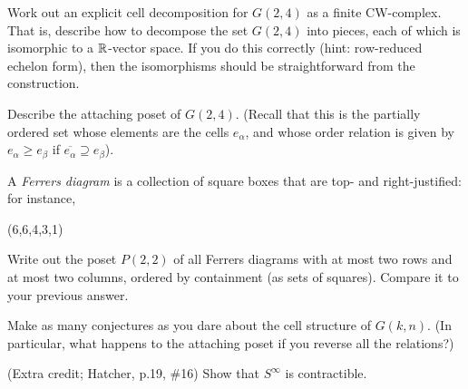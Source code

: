 \probpart Work out an explicit cell decomposition for $G(2,4)$
as a finite CW-complex.  That is,
describe how to decompose the set $G(2,4)$ into pieces, each of which is
isomorphic to a $\mathbb{R}$-vector space.
If you do this correctly (hint: row-reduced echelon form),
then the isomorphisms should be straightforward from the construction.

\probpart Describe the attaching poset of $G(2,4)$.  (Recall that this
is the partially ordered
set whose elements are the cells $e_\alpha$, and whose order
relation is given by $e_\alpha\geq e_\beta$ if
$\overline{e_\alpha}\supseteq e_\beta$).

\probpart A \emph{Ferrers diagram} is a collection of square boxes that
are top- and right-justified: for instance,
\begin{center}
\yng(6,6,4,3,1)
\end{center}
Write out the poset $P(2,2)$ of all Ferrers diagrams with at most two 
rows and at most two columns, ordered by containment (as sets of 
squares).  Compare it to your previous answer.

\probpart Make as many conjectures as you dare about the cell structure of
$G(k,n)$.  (In particular, what happens to the attaching poset if you
reverse all the relations?)

%
%

\prob (Extra credit; Hatcher, p.19, \#16)
Show that $S^\infty$ is contractible.


